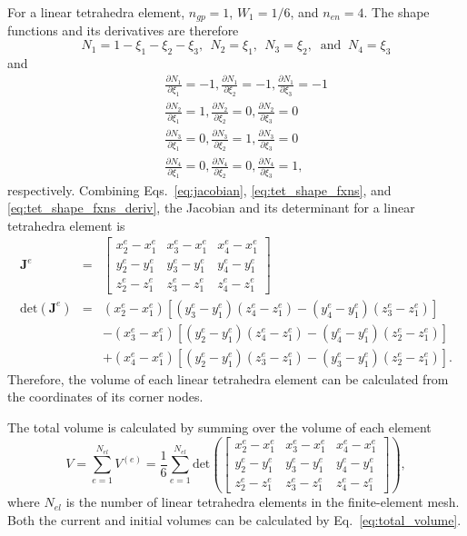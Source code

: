 For a linear tetrahedra element, $n_{gp}=1$, $W_1=1/6$, and $n_{en}=4$. The shape functions and its derivatives are therefore
%
\begin{equation}
N_1 = 1- \xi_1 - \xi_2 - \xi_3, \ \ 
N_2 = \xi_1, \ \
N_3 = \xi_2, \ \text{ and } \
N_4 = \xi_3
\label{eq:tet_shape_fxns}
\end{equation}
%
and
%
\begin{eqnarray}
&&\frac{\partial N_1}{\partial \xi_1} = -1, \frac{\partial N_1}{\partial \xi_2} = -1, \frac{\partial N_1}{\partial \xi_3} = -1 \nonumber\\
%
&&\frac{\partial N_2}{\partial \xi_1} = 1, \frac{\partial N_2}{\partial \xi_2} = 0, \frac{\partial N_2}{\partial \xi_3} = 0 \nonumber\\
%
&&\frac{\partial N_3}{\partial \xi_1} = 0, \frac{\partial N_3}{\partial \xi_2} = 1, \frac{\partial N_3}{\partial \xi_3} = 0 \nonumber\\
%
&&\frac{\partial N_4}{\partial \xi_1} = 0, \frac{\partial N_4}{\partial \xi_2} = 0, \frac{\partial N_4}{\partial \xi_3} = 1,
\label{eq:tet_shape_fxns_deriv}
\end{eqnarray}
%
respectively. Combining Eqs.\ \eqref{eq:jacobian}, \eqref{eq:tet_shape_fxns}, and \eqref{eq:tet_shape_fxns_deriv}, the Jacobian and its determinant for a linear tetrahedra element is 
%
\begin{eqnarray}
\pmb{J}^e &=& \begin{bmatrix}
x_2^e - x_1^e & x_3^e - x_1^e & x_4^e - x_1^e \\
%
y_2^e - y_1^e & y_3^e - y_1^e & y_4^e - y_1^e \\
%
z_2^e - z_1^e & z_3^e - z_1^e & z_4^e - z_1^e 
\end{bmatrix} \nonumber\\
%
\text{det}(\pmb{J}^e) &=& (x_2^e - x_1^e)[(y_3^e - y_1^e)(z_4^e - z_1^e)-(y_4^e - y_1^e)(z_3^e - z_1^e)] \nonumber\\
%
&&-(x_3^e - x_1^e)[(y_2^e - y_1^e)(z_4^e - z_1^e)-(y_4^e - y_1^e)(z_2^e - z_1^e)] \nonumber\\
%
&&+(x_4^e - x_1^e)[(y_2^e - y_1^e)(z_3^e - z_1^e)-(y_3^e - y_1^e)(z_2^e - z_1^e)].
\end{eqnarray}
%
Therefore, the volume of each linear tetrahedra element can be calculated from the coordinates of its corner nodes.

The total volume is calculated by summing over the volume of each element
%
\begin{equation}
V = \sum_{e=1}^{N_{el}} V^{(e)} = \frac{1}{6}\sum_{e=1}^{N_{el}}\text{det}\left( \begin{bmatrix}
x_2^e - x_1^e & x_3^e - x_1^e & x_4^e - x_1^e \\
%
y_2^e - y_1^e & y_3^e - y_1^e & y_4^e - y_1^e \\
%
z_2^e - z_1^e & z_3^e - z_1^e & z_4^e - z_1^e 
\end{bmatrix}\right),
\label{eq:total_volume}
\end{equation}
%
where $N_{el}$ is the number of linear tetrahedra elements in the finite-element mesh. Both the current and initial volumes can be calculated by Eq.\ \eqref{eq:total_volume}.

